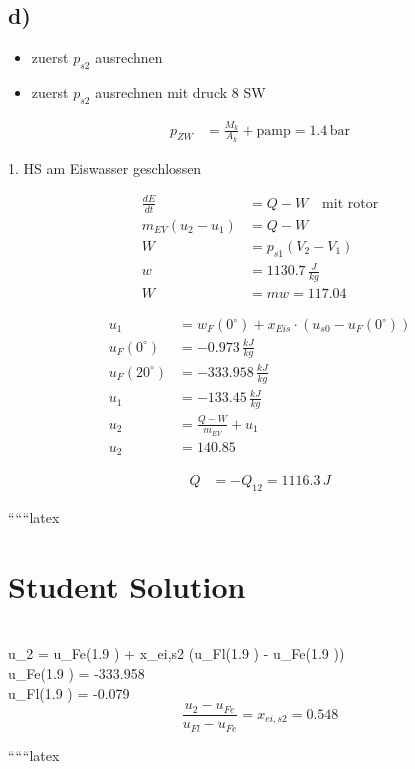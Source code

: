 

\subsection*{d)}

\begin{itemize}
    \item zuerst $p_{s2}$ ausrechnen
    \item zuerst $p_{s2}$ ausrechnen mit druck 8 SW
\end{itemize}

\begin{align*}
p_{ZW} &= \frac{M_{k}}{A_{k}} + \text{pamp} = 1.4 \, \text{bar}
\end{align*}

1. HS am Eiswasser geschlossen

\begin{align*}
\frac{dE}{dt} &= Q - W \quad \text{mit rotor} \\
m_{EV}(u_2 - u_1) &= Q - W \\
W &= p_{s1}(V_2 - V_1) \\
w &= 1130.7 \, \frac{J}{kg} \\
W &= m w = 117.04
\end{align*}

\begin{align*}
u_1 &= w_{F}(0^\circ) + x_{Eis} \cdot (u_{s0} - u_{F}(0^\circ)) \\
u_{F}(0^\circ) &= -0.973 \, \frac{kJ}{kg} \\
u_{F}(20^\circ) &= -333.958 \, \frac{kJ}{kg} \\
u_1 &= -133.45 \, \frac{kJ}{kg} \\
u_2 &= \frac{Q - W}{m_{EV}} + u_1 \\
u_2 &= 140.85
\end{align*}

\begin{align*}
Q &= -Q_{12} = 1116.3 \, J
\end{align*}

``````latex


\section*{Student Solution}

 \\
u_2 = u_{Fe}(1.9 ) + x_{ei,s2} (u_{Fl}(1.9 ) - u_{Fe}(1.9 )) \\
u_{Fe}(1.9 ) = -333.958  \\
u_{Fl}(1.9 ) = -0.079  \\

\[
\frac{u_2 - u_{Fe}}{u_{Fl} - u_{Fe}} = x_{ei,s2} = 0.548
\]

``````latex